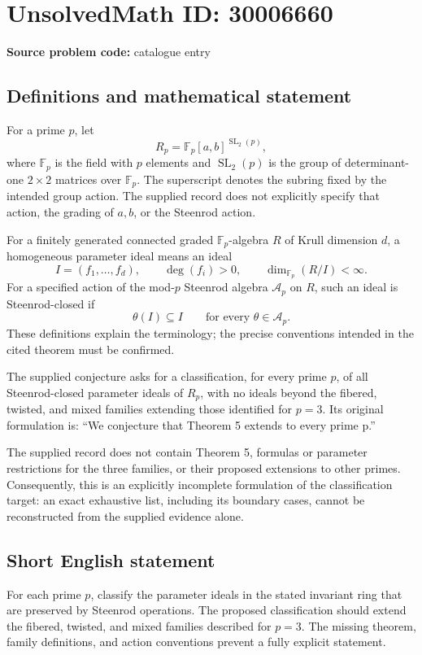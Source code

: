 \documentclass[11pt]{article}
\newcommand{\F}{\mathbb{F}}
\begin{document}
\section*{UnsolvedMath ID: 30006660}
\textbf{Source problem code:} catalogue entry
\subsection{Definitions and mathematical statement}
For a prime \(p\), let
\[
R_p=\F_p[a,b]^{\operatorname{SL}_2(p)},
\]
where \(\F_p\) is the field with \(p\) elements and \(\operatorname{SL}_2(p)\) is the group of determinant-one \(2\times2\) matrices over \(\F_p\). The superscript denotes the subring fixed by the intended group action. The supplied record does not explicitly specify that action, the grading of \(a,b\), or the Steenrod action.

For a finitely generated connected graded \(\F_p\)-algebra \(R\) of Krull dimension \(d\), a homogeneous parameter ideal means an ideal
\[
I=(f_1,\ldots,f_d),\qquad \deg(f_i)>0,
\qquad \dim_{\F_p}(R/I)<\infty.
\]
For a specified action of the mod-\(p\) Steenrod algebra \(\mathcal A_p\) on \(R\), such an ideal is Steenrod-closed if
\[
\theta(I)\subseteq I\qquad\text{for every }\theta\in\mathcal A_p.
\]
These definitions explain the terminology; the precise conventions intended in the cited theorem must be confirmed.

The supplied conjecture asks for a classification, for every prime \(p\), of all Steenrod-closed parameter ideals of \(R_p\), with no ideals beyond the fibered, twisted, and mixed families extending those identified for \(p=3\). Its original formulation is: ``We conjecture that Theorem 5 extends to every prime p.''

The supplied record does not contain Theorem 5, formulas or parameter restrictions for the three families, or their proposed extensions to other primes. Consequently, this is an explicitly incomplete formulation of the classification target: an exact exhaustive list, including its boundary cases, cannot be reconstructed from the supplied evidence alone.
\subsection{Short English statement}
For each prime \(p\), classify the parameter ideals in the stated invariant ring that are preserved by Steenrod operations. The proposed classification should extend the fibered, twisted, and mixed families described for \(p=3\). The missing theorem, family definitions, and action conventions prevent a fully explicit statement.
\end{document}
